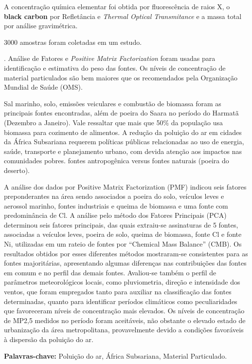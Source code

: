 A concentração química elementar foi obtida por fluorescência de raios X, 
o \textbf{black carbon} por Refletância e \textit{Thermal Optical Transmitance} 
e a massa total por análise gravimétrica.

3000 amostras foram coletadas em um estudo. 
\citep{zhou2011}
\citep{zhou2014chemical}


. Análise de Fatores e \textit{Positive Matrix Factorization} foram usadas para identificação e 
estimativa do peso das fontes. Os níveis de concentração de material particulados são bem maiores que os 
recomendados pela Organização Mundial de Saúde (OMS).%
 
Sal marinho, solo, emissões veiculares e combustão de biomassa foram as principais fontes encontradas, além 
de poeira do Saara no período do Harmatã (Dezembro a Janeiro). Vale ressaltar que mais que 50\% da população 
usa biomassa para cozimento de alimentos. A redução da poluição do ar em cidades da África Subsariana requerem 
políticas públicas relacionadas ao uso de energia, saúde, transporte e planejamento urbano, com devida atenção 
aos impactos nas comunidades pobres.
fontes antropogênica versus fontes naturais (poeira do deserto).



 A análise dos dados por Positive Matrix Factorization (PMF) indicou seis fatores preponderantes na área sendo associados a poeira do solo, veículos leves e aerossol marinho, fontes industriais e queima de biomassa e uma fonte com predominância de Cl. A análise pelo método dos Fatores Principais (PCA) determinou seis fatores principais, das quais extraiu-se assinaturas de 5 fontes, associadas a veículos leves, poeira de solo, queima de biomassa, fonte Cl e fonte Ni, utilizadas em um rateio de fontes por “Chemical Mass Balance” (CMB). Os resultados obtidos por esses diferentes métodos mostraram-se consistentes para as fontes majoritárias, apresentando algumas diferenças nas contribuições das fontes em comum e no perfil das demais fontes. Avaliou-se também o perfil de parâmetros meteorológicos locais, como pluviometria, direção e intensidade dos ventos, que foram empregados tanto para auxiliar na classificação das fontes determinadas, quanto para identificar períodos climáticos como peculiaridades que favoreceram níveis de concentração mais elevados. Os níveis de concentração de MP2,5 medidos no período foram aceitáveis, não obstante o elevado estado de urbanização da área metropolitana, provavelmente devido a condições favoráveis à dispersão da poluição do ar.



\par
\vspace{1em}
\noindent\textbf{Palavras-chave:}  Poluição do ar, África Subsariana, Material Particulado.
\newpage
